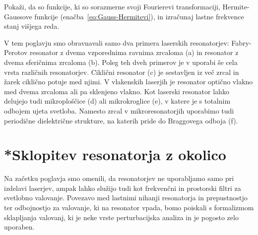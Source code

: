 \begin{definition}
Pokaži, da so funkcije, ki so sorazmerne svoji Fourierevi transformaciji, 
Hermite-Gaussove funkcije (enačba~\ref{eq:Gauss-Hermitevi}), in 
izračunaj lastne frekvence stanj višjega reda.
\end{definition}

\begin{remark}
V tem poglavju smo obravnavali samo dva primera laserskih resonatorjev: Fabry-Perotov
resonator z dvema vzporednima ravnima zrcaloma (a) in resonator z dvema sferičnima zrcaloma (b).
Poleg teh dveh primerov je v uporabi še cela vrsta različnih resonatorjev. Ciklični
resonator (c) je
sestavljen iz več zrcal in žarek ciklično potuje med njimi. V vlakenskih laserjih je resonator
optično vlakno med dvema zrcaloma ali pa sklenjeno vlakno. 
Kot laserski resonator lahko delujejo tudi mikroploščice (d) ali mikrokroglice (e), 
v katere je s totalnim odbojem ujeta svetloba. 
Namesto zrcal v mikroresonatorjih uporabimo tudi periodične dielektrične strukture, na katerih 
pride do Braggovega odboja (f).
\end{remark}

\begin{figure}[h]
\centering
\def\svgwidth{140truemm} 

\label{fig:resonatorji}
\end{figure}

\section{*Sklopitev resonatorja z okolico}
Na začetku poglavja smo omenili, da resonatorjev ne uporabljamo samo pri 
izdelavi laserjev, ampak lahko služijo tudi kot frekvenčni in
prostorski filtri za svetlobno valovanje. Povezavo med lastnimi nihanji
resonatorja in prepustnostjo ter odbojnostjo za valovanje, ki na resonator
vpada, bomo poiskali s formalizmom sklapljanja valovanj, 
ki je neke vrste perturbacijska analiza in je pogosto zelo uporaben.

